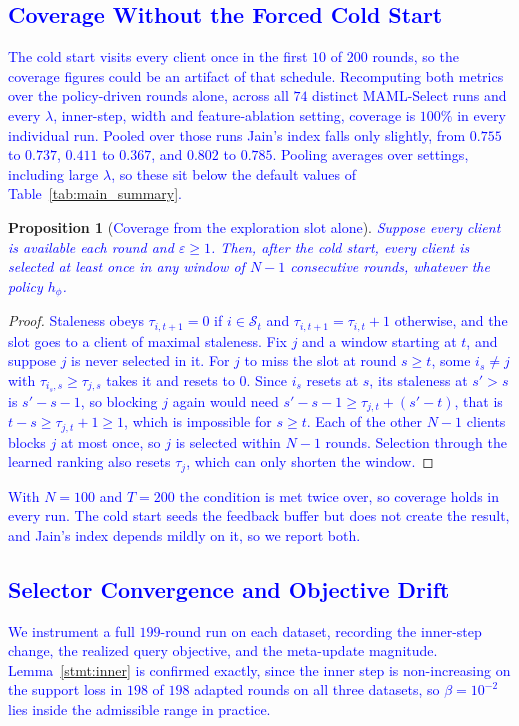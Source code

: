 \documentclass[journal]{IEEEtran}
\newtheorem{proposition}{Proposition}
\theoremstyle{remark}
\newcommand{\revtwo}[1]{\textcolor{blue}{#1}}
\begin{document}
\subsection{\revtwo{Coverage Without the Forced Cold Start}}\label{sec:fairness_recheck}
\revtwo{The cold start visits every client once in the first $10$ of $200$ rounds, so the coverage figures could be an artifact of that schedule. Recomputing both metrics over the policy-driven rounds alone, across all $74$ distinct MAML-Select runs and every $\lambda$, inner-step, width and feature-ablation setting, coverage is $100\%$ in every individual run. Pooled over those runs Jain's index falls only slightly, from $0.755$ to $0.737$, $0.411$ to $0.367$, and $0.802$ to $0.785$. Pooling averages over settings, including large $\lambda$, so these sit below the default values of Table~\ref{tab:main_summary}.}

\begin{proposition}[\revtwo{Coverage from the exploration slot alone}]\label{prop:coverage}
\revtwo{Suppose every client is available each round and $\varepsilon\ge 1$. Then, after the cold start, every client is selected at least once in any window of $N-1$ consecutive rounds, whatever the policy $h_\phi$.}
\end{proposition}
\begin{proof}
\revtwo{Staleness obeys $\tau_{i,t+1}=0$ if $i\in\mathcal{S}_t$ and $\tau_{i,t+1}=\tau_{i,t}+1$ otherwise, and the slot goes to a client of maximal staleness. Fix $j$ and a window starting at $t$, and suppose $j$ is never selected in it. For $j$ to miss the slot at round $s\ge t$, some $i_s\neq j$ with $\tau_{i_s,s}\ge\tau_{j,s}$ takes it and resets to $0$. Since $i_s$ resets at $s$, its staleness at $s'>s$ is $s'-s-1$, so blocking $j$ again would need $s'-s-1\ge\tau_{j,t}+(s'-t)$, that is $t-s\ge\tau_{j,t}+1\ge 1$, which is impossible for $s\ge t$. Each of the other $N-1$ clients blocks $j$ at most once, so $j$ is selected within $N-1$ rounds. Selection through the learned ranking also resets $\tau_j$, which can only shorten the window.}
\end{proof}
\revtwo{With $N=100$ and $T=200$ the condition is met twice over, so coverage holds in every run. The cold start seeds the feedback buffer but does not create the result, and Jain's index depends mildly on it, so we report both.}

\subsection{\revtwo{Selector Convergence and Objective Drift}}\label{sec:selector_convergence}
\revtwo{We instrument a full $199$-round run on each dataset, recording the inner-step change, the realized query objective, and the meta-update magnitude. Lemma~\ref{stmt:inner} is confirmed exactly, since the inner step is non-increasing on the support loss in $198$ of $198$ adapted rounds on all three datasets, so $\beta=10^{-2}$ lies inside the admissible range in practice.}
\end{document}
